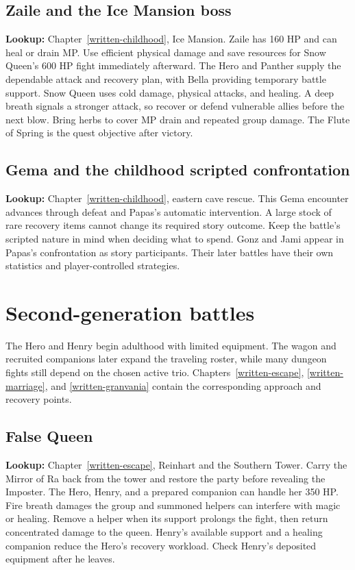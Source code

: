 \subsection{Zaile and the Ice Mansion boss}
\textbf{Lookup:} Chapter~\ref{written-childhood}, Ice Mansion. Zaile has 160 HP and can heal or drain MP. Use efficient physical damage and save resources for Snow Queen's 600 HP fight immediately afterward. The Hero and Panther supply the dependable attack and recovery plan, with Bella providing temporary battle support. Snow Queen uses cold damage, physical attacks, and healing. A deep breath signals a stronger attack, so recover or defend vulnerable allies before the next blow. Bring herbs to cover MP drain and repeated group damage. The Flute of Spring is the quest objective after victory.

\subsection{Gema and the childhood scripted confrontation}
\textbf{Lookup:} Chapter~\ref{written-childhood}, eastern cave rescue. This Gema encounter advances through defeat and Papas's automatic intervention. A large stock of rare recovery items cannot change its required story outcome. Keep the battle's scripted nature in mind when deciding what to spend. Gonz and Jami appear in Papas's confrontation as story participants. Their later battles have their own statistics and player-controlled strategies.

\section{Second-generation battles}
The Hero and Henry begin adulthood with limited equipment. The wagon and recruited companions later expand the traveling roster, while many dungeon fights still depend on the chosen active trio. Chapters~\ref{written-escape}, \ref{written-marriage}, and \ref{written-granvania} contain the corresponding approach and recovery points.

\subsection{False Queen}
\textbf{Lookup:} Chapter~\ref{written-escape}, Reinhart and the Southern Tower. Carry the Mirror of Ra back from the tower and restore the party before revealing the Imposter. The Hero, Henry, and a prepared companion can handle her 350 HP. Fire breath damages the group and summoned helpers can interfere with magic or healing. Remove a helper when its support prolongs the fight, then return concentrated damage to the queen. Henry's available support and a healing companion reduce the Hero's recovery workload. Check Henry's deposited equipment after he leaves.

